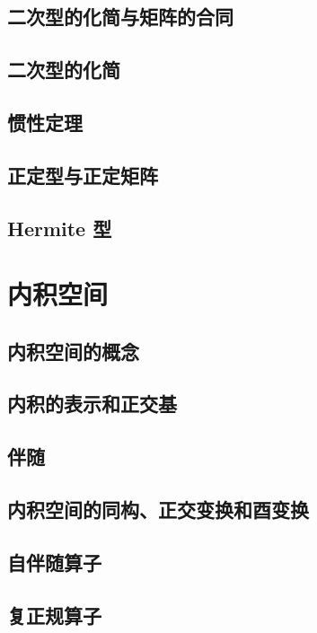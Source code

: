 \documentclass[UTF8,12pt,a4paper,fontset=fandol]{ctexbook}
\begin{document}
\section{二次型的化简与矩阵的合同}

\section{二次型的化简}

\section{惯性定理}

\section{正定型与正定矩阵}

\section{Hermite 型}


\chapter{内积空间}

\section{内积空间的概念}

\section{内积的表示和正交基}

\section{伴随}

\section{内积空间的同构、正交变换和酉变换}

\section{自伴随算子}

\section{复正规算子}
\end{document}
